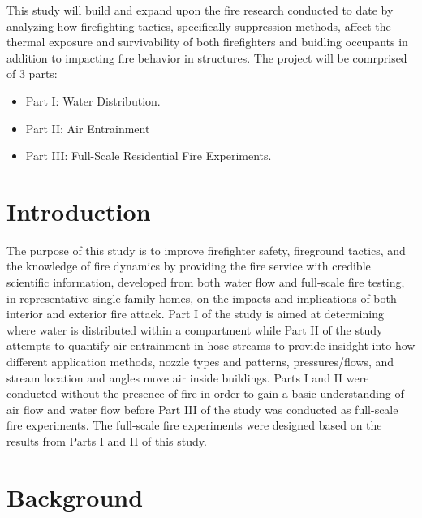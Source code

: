 \documentclass[12pt,oneside]{book}
\begin{document}
This study will build and expand upon the fire research conducted to date by analyzing how firefighting tactics, specifically suppression methods, affect the thermal exposure and survivability of both firefighters and buidling occupants in addition to impacting fire behavior in structures. The project will be comrprised of 3 parts:

\vspace*{\baselineskip}
\begin{itemize}
	\item Part I: Water Distribution.
	\item Part II: Air Entrainment
	\item Part III: Full-Scale Residential Fire Experiments.
	\end{itemize}
\vspace*{\baselineskip}

\newpage

\tableofcontents

\newpage

\chapter*{Introduction}

The purpose of this study is to improve firefighter safety, fireground tactics, and the knowledge of fire dynamics by providing the fire service with credible scientific information, developed from both water flow and full-scale fire testing, in representative single family homes, on the impacts and implications of both interior and exterior fire attack. Part I of the study is aimed at determining where water is distributed within a compartment while Part II of the study attempts to quantify air entrainment in hose streams to provide insidght into how different application methods, nozzle types and patterns, pressures/flows, and stream location and angles move air inside buildings. Parts I and II were conducted without the presence of fire in order to gain a basic understanding of air flow and water flow before Part III of the study was conducted as full-scale fire experiments. The full-scale fire experiments were designed based on the results from Parts I and II of this study. 

\clearpage

\chapter{Background}
\end{document}
